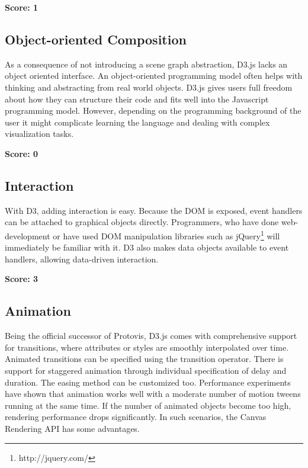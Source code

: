 \SuperPar \textbf{Score: 1}

\subsection{Object-oriented Composition}

As a consequence of not introducing a scene graph abstraction, D3.js lacks an object oriented interface. An object-oriented programming model often helps with thinking and abstracting from real world objects. D3.js gives users full freedom about how they can structure their code and fits well into the Javascript programming model. However, depending on the programming background of the user it might complicate learning the language and dealing with complex visualization tasks.

\SuperPar \textbf{Score: 0}


\subsection{Interaction}

With D3, adding interaction is easy. Because the DOM is exposed, event handlers can be attached to graphical objects directly. Programmers, who have done web-development or have used DOM manipulation libraries such as jQuery\footnote{http://jquery.com/} will immediately be familiar with it. D3 also makes data objects available to event handlers, allowing data-driven interaction.

\SuperPar \textbf{Score: 3}

\subsection{Animation}

Being the official successor of Protovis, D3.js comes with comprehensive support for transitions, where attributes or styles are smoothly interpolated over time. Animated transitions can be specified using the transition operator. There is support for staggered animation through individual specification of delay and duration. The easing method can be customized too. Performance experiments have shown that animation works well with a moderate number of motion tweens running at the same time. If the number of animated objects become too high, rendering performance drops significantly. In such scenarios, the Canvas Rendering API has some advantages.

